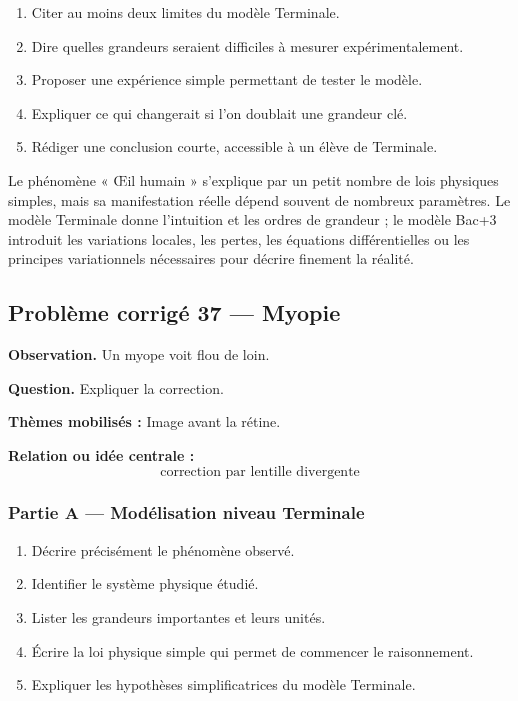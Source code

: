 \documentclass[11pt,a4paper]{article}
\begin{document}
\begin{enumerate}
  \item Citer au moins deux limites du modèle Terminale.
  \item Dire quelles grandeurs seraient difficiles à mesurer expérimentalement.
  \item Proposer une expérience simple permettant de tester le modèle.
  \item Expliquer ce qui changerait si l'on doublait une grandeur clé.
  \item Rédiger une conclusion courte, accessible à un élève de Terminale.
\end{enumerate}

\begin{corrigebox}
Le phénomène « Œil humain » s'explique par un petit nombre de lois physiques simples, mais sa manifestation réelle dépend souvent de nombreux paramètres. Le modèle Terminale donne l'intuition et les ordres de grandeur ; le modèle Bac+3 introduit les variations locales, les pertes, les équations différentielles ou les principes variationnels nécessaires pour décrire finement la réalité.
\end{corrigebox}

\subsection{Problème corrigé 37 — Myopie}

\begin{exercicebox}
\textbf{Observation.} Un myope voit flou de loin.

\medskip
\textbf{Question.} Expliquer la correction.

\medskip
\textbf{Thèmes mobilisés :} Image avant la rétine.

\medskip
\textbf{Relation ou idée centrale :}
\[
\text{correction par lentille divergente}
\]
\end{exercicebox}

\subsubsection*{Partie A — Modélisation niveau Terminale}

\begin{enumerate}
  \item Décrire précisément le phénomène observé.
  \item Identifier le système physique étudié.
  \item Lister les grandeurs importantes et leurs unités.
  \item Écrire la loi physique simple qui permet de commencer le raisonnement.
  \item Expliquer les hypothèses simplificatrices du modèle Terminale.
\end{enumerate}
\end{document}
